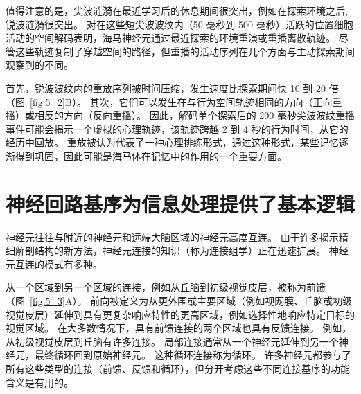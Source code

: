 值得注意的是，尖波涟漪在最近学习后的休息期间很突出，例如在探索环境之后,锐波涟漪很突出。
对在这些短尖波波纹内（50 毫秒到 500 毫秒）活跃的位置细胞活动的空间解码表明，海马神经元通过最近探索的环境重演或重播离散轨迹。
尽管这些轨迹复制了穿越空间的路径，但重播的活动序列在几个方面与主动探索期间观察到的不同。


首先，锐波波纹内的重放序列被时间压缩，发生速度比探索期间快 10 到 20 倍（图~\ref{fig:5_2}B）。 
其次，它们可以发生在与行为空间轨迹相同的方向（正向重播）或相反的方向（反向重播）。
因此，解码单个探索后的 200 毫秒尖波波纹重播事件可能会揭示一个虚拟的心理轨迹，该轨迹跨越 2 到 4 秒的行为时间，从它的经历中回放。
重放被认为代表了一种心理排练形式，通过这种形式，某些记忆逐渐得到巩固，因此可能是海马体在记忆中的作用的一个重要方面。



\section{神经回路基序为信息处理提供了基本逻辑}

神经元往往与附近的神经元和远端大脑区域的神经元高度互连。
由于许多揭示精细解剖结构的新方法，神经元连接的知识（称为连接组学）正在迅速扩展。
神经元互连的模式有多种。


从一个区域到另一个区域的连接，例如从丘脑到初级视觉皮层，被称为前馈（图~\ref{fig:5_3}A）。 
前向被定义为从更外围或主要区域（例如视网膜、丘脑或初级视觉皮层）延伸到具有更复杂响应特性的更高区域，例如选择性地响应特定目标的视觉区域。
在大多数情况下，具有前馈连接的两个区域也具有反馈连接。
例如，从初级视觉皮层到丘脑有许多连接。
局部连接通常从一个神经元延伸到另一个神经元，最终循环回到原始神经元。
这种循环连接称为循环。
许多神经元都参与了所有这些类型的连接（前馈、反馈和循环），但分开考虑这些不同连接基序的功能含义是有用的。


